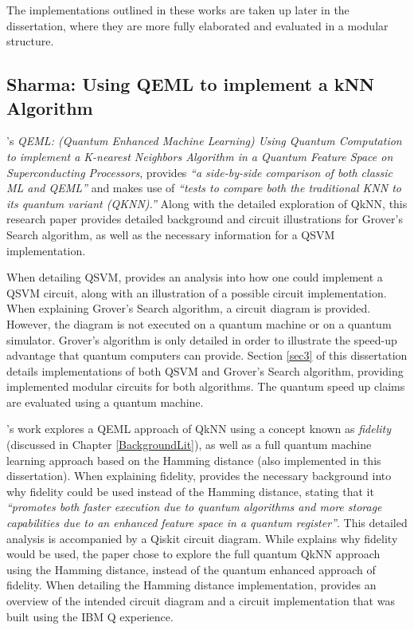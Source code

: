 The implementations outlined in these works are taken up later in the dissertation, where they are more fully elaborated and evaluated in a modular structure.


\subsection{Sharma: Using QEML to implement a kNN Algorithm}
\citep{sharmaQeml}'s \emph{ QEML: (Quantum Enhanced Machine Learning) Using Quantum Computation to implement a K-nearest Neighbors Algorithm in a Quantum Feature Space on Superconducting Processors}, provides \emph{``a side-by-side comparison of both classic ML and QEML''} and makes use of \emph{``tests to compare both the traditional KNN to its quantum variant (QKNN).''} Along with the detailed exploration of QkNN, this research paper provides detailed background and circuit illustrations for Grover’s Search algorithm, as well as the necessary information for a QSVM implementation.  

When detailing QSVM, \citeauthor{sharmaQeml} provides an analysis into how one could implement a QSVM circuit, along with an illustration of a possible circuit implementation. When explaining Grover's Search algorithm, a circuit diagram is provided. However, the diagram is not executed on a quantum machine or on a quantum simulator. Grover's algorithm is only detailed in order to illustrate the speed-up advantage that quantum computers can provide. Section \ref{sec3} of this dissertation details implementations of both QSVM and Grover’s Search algorithm, providing implemented modular circuits for both algorithms. The quantum speed up claims are evaluated using a quantum machine. 

\citeauthor{sharmaQeml}’s work explores a QEML approach of QkNN using a concept known as \emph{fidelity} (discussed in Chapter \ref{BackgroundLit}), as well as a full quantum machine learning approach based on the Hamming distance (also implemented in this dissertation). When explaining fidelity, \citeauthor{sharmaQeml} provides the necessary background into why fidelity could be used instead of the Hamming distance, stating that it \emph{``promotes both faster execution due to quantum algorithms and more storage capabilities due to an enhanced feature space in a quantum register''}. This detailed analysis is accompanied by a Qiskit circuit diagram.
While \citeauthor{sharmaQeml} explains why fidelity would be used, the paper chose to explore the full quantum QkNN approach using the Hamming distance, instead of the quantum enhanced approach of fidelity. When detailing the Hamming distance implementation, \citeauthor{sharmaQeml} provides an overview of the intended circuit diagram and a circuit implementation that was built using the IBM Q experience. 


